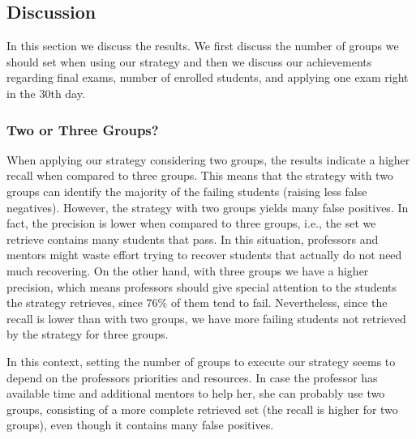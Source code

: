 
\subsection{Discussion}

In this section we discuss the results. We first discuss the number of groups we should set when using our strategy and then we discuss our achievements regarding final exams, number of enrolled students, and applying one exam right in the 30th day.

\subsubsection{Two or Three Groups?}

When applying our strategy considering two groups, the results indicate a higher recall when compared to three groups. This means that the strategy with two groups can identify the majority of the failing students (raising less false negatives). However, the strategy with two groups yields many false positives. In fact, the precision is lower when compared to three groups, i.e., the set we retrieve contains many students that pass. In this situation, professors and mentors might waste effort trying to recover students that actually do not need much recovering. On the other hand, with three groups we have a higher precision, which means professors should give special attention to the students the strategy retrieves, since 76\% of them tend to fail. Nevertheless, since the recall is lower than with two groups, we have more failing students not retrieved by the strategy for three groups.


In this context, setting the number of groups to execute our strategy seems to depend on the professors priorities and resources. In case the professor has available time and additional mentors to help her, she can probably use two groups, consisting of a more complete retrieved set (the recall is higher for two groups), even though it contains many false positives.

